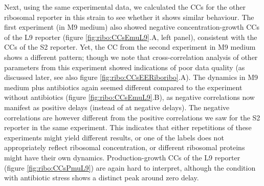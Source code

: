 Next, using the same experimental data, 
we calculated the CCs for the other ribosomal reporter in this strain to see whether it shows similar behaviour.
%
The first experiment (in M9 medium) also showed
negative concentration-growth CCs of the L9 reporter (figure \ref{fig:ribo:CCsEmuL9}.A, left panel), consistent with the CCs of the S2 reporter.
%
Yet, the CC from the second experiment in M9 medium shows a different pattern; 
though we note that cross-correlation analysis of other parameters from this experiment showed indications of poor data quality (as discussed later, see also figure \ref{fig:ribo:CCsEERiboribo}.A). %
%
%
The dynamics in M9 medium plus antibiotics again seemed different compared to the experiment without antibiotics (figure \ref{fig:ribo:CCsEmuL9}.B), as negative correlations now manifest as positive delays (instead of at negative delays).
The negative correlations are however different from the positive correlations we saw for the S2 reporter in the same experiment.
%
This indicates that either repetitions of these experiments might yield different results, or one of the labels does not appropriately reflect ribosomal concentration, or different ribosomal proteins might have their own dynamics.
%
Production-growth CCs of the L9 reporter (figure \ref{fig:ribo:CCsPmuL9}) are again hard to interpret, although the condition with antibiotic stress shows a distinct peak around zero delay.

